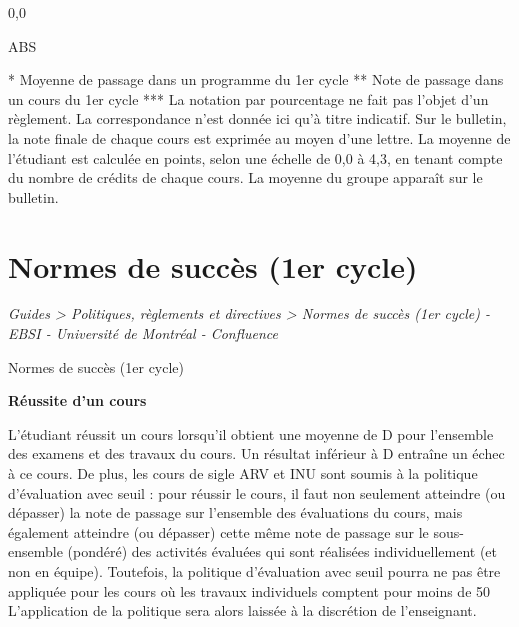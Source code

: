 \documentclass [12 pt]{article}
\begin{document}
                            
                                0,0
                            
                            
                                ABS
                            
                        
                    
                
            
            * Moyenne de passage dans un programme
                du 1er cycle
            ** Note de passage dans un cours du 1er cycle
            *** La notation par pourcentage ne fait pas l'objet d'un règlement. La correspondance
                n'est donnée ici qu'à titre indicatif. Sur le bulletin, la note finale de chaque
                cours est exprimée au moyen d'une lettre. La moyenne de l'étudiant est calculée en
                points, selon une échelle de 0,0 à 4,3, en tenant compte du nombre de crédits de
                chaque cours. La moyenne du groupe apparaît sur le bulletin.
        
    
    
        \newpage
        \section {
        Normes de succès (1er cycle)
        }
        
        
        
        \textit{
        Guides > Politiques, règlements et directives > Normes de succès (1er cycle) -
            EBSI - Université de Montréal - Confluence
        }
    
        Normes de succès (1er cycle)
        
            
        \textbf{
        Réussite d'un cours
        }
    
            L'étudiant réussit un cours lorsqu'il obtient une moyenne de D pour l'ensemble des
                examens et des travaux du cours. Un résultat inférieur à D entraîne un échec à ce
                cours. De plus, les cours de sigle ARV et INU sont soumis à la politique
                d'évaluation avec seuil : pour réussir le cours, il faut non seulement atteindre (ou
                dépasser) la note de passage sur l'ensemble des évaluations du cours, mais également
                atteindre (ou dépasser) cette même note de passage sur le sous-ensemble (pondéré)
                des activités évaluées qui sont réalisées individuellement (et non en équipe).
                Toutefois, la politique d'évaluation avec seuil pourra ne pas être appliquée pour
                les cours où les travaux individuels comptent pour moins de 50 %
                L'application de la politique sera alors laissée à la discrétion de
                l'enseignant.
            
\end{document}
